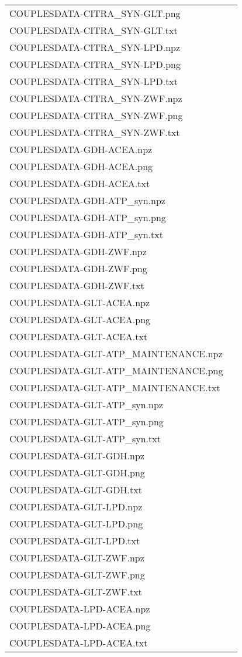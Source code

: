 \documentclass[a4paper, parskip=full]{scrreprt}
\begin{document}
\begin{longtable}{ll}
COUPLESDATA-CITRA\_SYN-GLT.png\\
COUPLESDATA-CITRA\_SYN-GLT.txt\\
COUPLESDATA-CITRA\_SYN-LPD.npz\\
COUPLESDATA-CITRA\_SYN-LPD.png\\
COUPLESDATA-CITRA\_SYN-LPD.txt\\
COUPLESDATA-CITRA\_SYN-ZWF.npz\\
COUPLESDATA-CITRA\_SYN-ZWF.png\\
COUPLESDATA-CITRA\_SYN-ZWF.txt\\
COUPLESDATA-GDH-ACEA.npz\\
COUPLESDATA-GDH-ACEA.png\\
COUPLESDATA-GDH-ACEA.txt\\
COUPLESDATA-GDH-ATP\_syn.npz\\
COUPLESDATA-GDH-ATP\_syn.png\\
COUPLESDATA-GDH-ATP\_syn.txt\\
COUPLESDATA-GDH-ZWF.npz\\
COUPLESDATA-GDH-ZWF.png\\
COUPLESDATA-GDH-ZWF.txt\\
COUPLESDATA-GLT-ACEA.npz\\
COUPLESDATA-GLT-ACEA.png\\
COUPLESDATA-GLT-ACEA.txt\\
COUPLESDATA-GLT-ATP\_MAINTENANCE.npz\\
COUPLESDATA-GLT-ATP\_MAINTENANCE.png\\
COUPLESDATA-GLT-ATP\_MAINTENANCE.txt\\
COUPLESDATA-GLT-ATP\_syn.npz\\
COUPLESDATA-GLT-ATP\_syn.png\\
COUPLESDATA-GLT-ATP\_syn.txt\\
COUPLESDATA-GLT-GDH.npz\\
COUPLESDATA-GLT-GDH.png\\
COUPLESDATA-GLT-GDH.txt\\
COUPLESDATA-GLT-LPD.npz\\
COUPLESDATA-GLT-LPD.png\\
COUPLESDATA-GLT-LPD.txt\\
COUPLESDATA-GLT-ZWF.npz\\
COUPLESDATA-GLT-ZWF.png\\
COUPLESDATA-GLT-ZWF.txt\\
COUPLESDATA-LPD-ACEA.npz\\
COUPLESDATA-LPD-ACEA.png\\
COUPLESDATA-LPD-ACEA.txt\\

\end{longtable}
\end{document}
